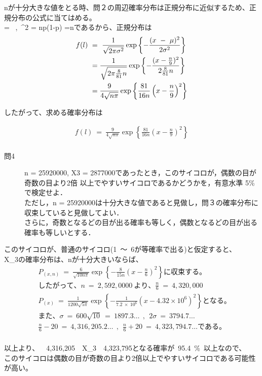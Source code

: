 \documentclass[12pt,a4paper]{jsarticle}
\begin{document}
{\displaystyle}nが十分大きな値をとる時、問２の周辺確率分布は正規分布に近似するため、正規分布の公式に当てはめる。\\
\mu  = ~,~\sigma^2 = np(1-p) =nであるから、正規分布は\\

\begin{align*}
    {\displaystyle}f(l)~&=~\frac{1}{\sqrt{2{\pi}{\sigma}^2}}\exp\left\{-\frac{(x ~-~ \mu)^2}{2\sigma^2}\right\} \\
    &= \frac{1}{\sqrt{2{\pi}\frac{8}{81}n}}\exp\left\{-\frac{(x-\frac{n}{9})^2}{2\frac{8}{81}n}\right\} \\
    &= \frac{9}{4\sqrt{n{\pi}}} \exp \left\{\frac{81}{16n}\left(x-\frac{n}{9}\right)^2\right\}
\end{align*}

したがって、求める確率分布は

\begin{align*}
    f(l) ~=~ \frac{9}{4\sqrt{n{\pi}}} \exp \left\{\frac{81}{16n}\left(x-\frac{n}{9}\right)^2\right\}\\
\end{align*}


\begin{description}
    \item [問4] n = 25920000, X3 = 2877000であったとき，このサイコロが，偶数の目が奇数の目より2倍
    以上でやすいサイコロであるかどうかを，有意水準 5{\%}で検定せよ．\\
    ただし，n = 25920000は十分大きな値であると見做し，問３の確率分布に収束していると見做してよい．\\
    さらに，奇数となるどの目が出る確率も等しく，偶数となるどの目が出る確率も等しいとする．
\end{description}

このサイコロが、普通のサイコロ(1~〜~6が等確率で出る)と仮定すると、\\
X_{3}の確率分布は、nが十分大きいならば、\\

\begin{align*}
    &P_{(x,n)} ~=~ \frac{6}{\sqrt{10n{\pi}}} \exp\left\{ -\frac{8}{15n}\left(x - \frac{n}{6}\right)^2  \right\}に収束する。\\
    &したがって、n ~=~ 2,592,0000~より、\frac{n}{6} ~=~ 4,320,000 \\
    &P_{(x)} ~=~ \frac{1}{1200\sqrt{5\pi}}\exp\left\{ -\frac{1}{7.2~×~10^6}\left(x-4.32×10^6\right)^2 \right\} となる。\\
    &また、\sigma ~=~ 600\sqrt{10} ~=~ 1897.3\dots ~~,~~ 2\sigma ~=~ 3794.7\dots \\
    &\frac{n}{6}-20 ~=~ 4,316,205.2\dots ~~,~~ \frac{n}{6}+20 ~=~ 4,323,794.7\dots である。\\
\end{align*}

以上より、~~4,316,205~\leqq~X_{3}~\leqq~4,323,795となる確率が~95.4~\%~以上なので、\\
このサイコロは偶数の目が奇数の目より2倍以上でやすいサイコロである可能性が高い。\\
\end{document}
